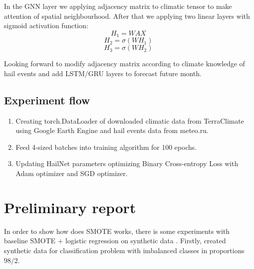 \documentclass{article}
\begin{document}
\newpage
In the GNN layer we applying adjacency matrix to climatic tensor to make attention of spatial neighbourhood. After that we applying two linear layers with sigmoid activation function:
\begin{equation}
    H_1 = WAX
\end{equation}
\begin{equation}
    H_2 = \sigma(WH_1)
\end{equation}
\begin{equation}
    H_3 = \sigma(WH_2)
\end{equation}

Looking forward to modify adjacency matrix according to climate knowledge of hail events and add LSTM/GRU layers to forecast future month.


\subsection{Experiment flow}
\begin{enumerate}
    \item  Creating torch.DataLoader of downloaded climatic data from TerraClimate using Google Earth Engine and hail events data from meteo.ru.
    \item Feed 4-sized batches into training algorithm for 100 epochs.
    \item Updating HailNet parameters optimizing Binary Cross-entropy Loss with Adam optimizer and SGD optimizer.
\end{enumerate}

\section{Preliminary report}
In order to show how does SMOTE works, there is some experiments with baseline SMOTE + logistic regression on synthetic data . Firstly, created synthetic data for classification problem with imbalanced classes in proportions $98/2$.
\end{document}
